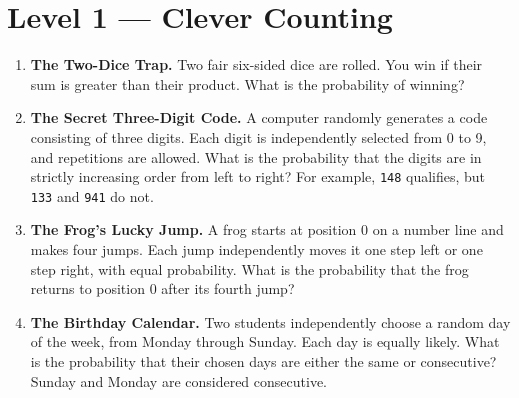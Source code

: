 \section*{Level 1 --- Clever Counting}
\begin{enumerate}[label=\textbf{\arabic*.}]
\item \textbf{The Two-Dice Trap.} Two fair six-sided dice are rolled. You win if their sum is greater than their product. What is the probability of winning?

\item \textbf{The Secret Three-Digit Code.} A computer randomly generates a code consisting of three digits. Each digit is independently selected from 0 to 9, and repetitions are allowed. What is the probability that the digits are in strictly increasing order from left to right? For example, \texttt{148} qualifies, but \texttt{133} and \texttt{941} do not.

\item \textbf{The Frog's Lucky Jump.} A frog starts at position 0 on a number line and makes four jumps. Each jump independently moves it one step left or one step right, with equal probability. What is the probability that the frog returns to position 0 after its fourth jump?

\item \textbf{The Birthday Calendar.} Two students independently choose a random day of the week, from Monday through Sunday. Each day is equally likely. What is the probability that their chosen days are either the same or consecutive? Sunday and Monday are considered consecutive.
\end{enumerate}

